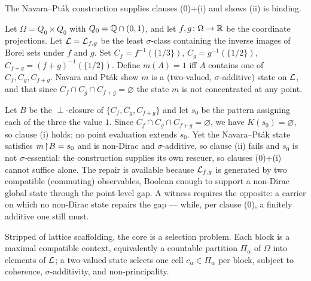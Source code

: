 The Navara--Pt\'ak construction supplies clauses (0)+(i) and shows (ii) is binding.

\begin{example}\label{ex:navara-ptak}
Let $\Omega = Q_0\times Q_0$ with $Q_0 = \mathbb{Q}\cap(0,1)$, and let
$f,g\colon\Omega\to\mathbb{R}$ be the coordinate projections. Let $\mathcal{L} = \mathcal{L}_{f,g}$ be
the least $\sigma$-class containing the inverse images of Borel sets under $f$
and $g$. Set $C_f = f^{-1}(\{1/3\})$, $C_g = g^{-1}(\{1/2\})$,
$C_{f+g} = (f+g)^{-1}(\{1/2\})$. Define $m(A)=1$ iff $A$ contains one of $C_f,
C_g, C_{f+g}$. Navara and Pt\'ak show $m$ is a (two-valued, $\sigma$-additive)
state on $\mathcal{L}$, and that since $C_f\cap C_g\cap C_{f+g}=\varnothing$ the state
$m$ is not concentrated at any point.
\end{example}

\begin{remark}\label{rem:np-builds-rescuer}
Let $B$ be the $\perp$-closure of $\{C_f, C_g, C_{f+g}\}$ and let $s_0$ be the
pattern assigning each of the three the value $1$. Since
$C_f\cap C_g\cap C_{f+g}=\varnothing$, we have $K(s_0)=\varnothing$, so clause (i)
holds: no point evaluation extends $s_0$. Yet the Navara--Pt\'ak state satisfies
$m\!\restriction\! B = s_0$ and is non-Dirac and $\sigma$-additive, so clause (ii) fails and
$s_0$ is not $\sigma$-essential: the construction supplies its own rescuer, so
clauses (0)+(i) cannot suffice alone. The repair is available because
$\mathcal{L}_{f,g}$ is generated by two compatible (commuting) observables, Boolean
enough to support a non-Dirac global state through the point-level gap. A witness
requires the opposite: a carrier on which no non-Dirac state repairs the gap ---
while, per clause (0), a finitely additive one still must.
\end{remark}

Stripped of lattice scaffolding, the core is a selection problem. Each block is
a maximal compatible context, equivalently a countable partition $\Pi_\alpha$ of
$\Omega$ into elements of $\mathcal{L}$; a two-valued state selects one cell
$c_\alpha\in\Pi_\alpha$ per block, subject to coherence, $\sigma$-additivity, and
non-principality.

